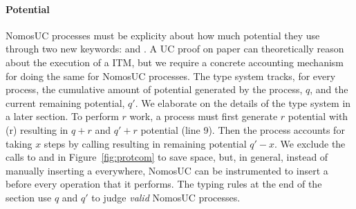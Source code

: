 \paragraph{Potential}
NomosUC processes must be explicity about how much potential they use through two new keywords: \inline{$\ngenpot$} and \inline{$\ntick$}.
A UC proof on paper can theoretically reason about the execution of a ITM, but we require a concrete accounting mechanism for doing the same for NomosUC processes. 
The type system tracks, for every process, the cumulative amount of potential generated by the process, $q$, and the current remaining potential, $q'$. We elaborate on the details of the type system in a later section.
To perform $r$ work, a process must first generate $r$ potential with \inline{$\ngenpot$}(r) resulting in $q+r$ and $q'+r$ potential (line 9).
Then the process accounts for taking $x$ steps by calling  resulting in remaining potential $q'-x$.
We exclude the calls to \igp and \itick in Figure~\ref{fig:protcom} to save space, but, in general, instead of manually inserting a \itick everywhere, NomosUC can be instrumented to insert a \itick before every operation that it performs.
The typing rules at the end of the section use $q$ and $q'$ to judge \emph{valid} NomosUC processes.


